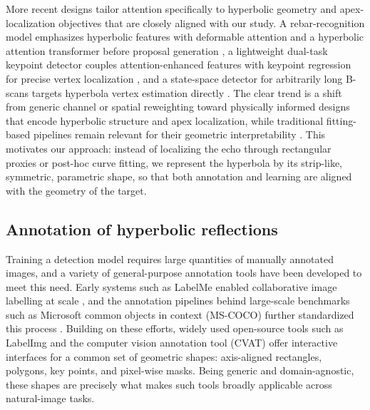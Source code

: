 \documentclass[lettersize,journal]{IEEEtran}
\begin{document}
More recent designs tailor attention specifically to hyperbolic geometry and apex-localization objectives that are closely aligned with our study. A rebar-recognition model emphasizes hyperbolic features with deformable attention and a hyperbolic attention transformer before proposal generation \cite{li2025rebar}, a lightweight dual-task keypoint detector couples attention-enhanced features with keypoint regression for precise vertex localization \cite{hou2025endtoend}, and a state-space detector for arbitrarily long B-scans targets hyperbola vertex estimation directly \cite{lan2024statespace}. The clear trend is a shift from generic channel or spatial reweighting toward physically informed designs that encode hyperbolic structure and apex localization, while traditional fitting-based pipelines remain relevant for their geometric interpretability \cite{lei2019autohyperbola}. This motivates our approach: instead of localizing the echo through rectangular proxies or post-hoc curve fitting, we represent the hyperbola by its strip-like, symmetric, parametric shape, so that both annotation and learning are aligned with the geometry of the target.


\subsection{Annotation of hyperbolic reflections}
Training a detection model requires large quantities of manually annotated images,
and a variety of general-purpose annotation tools have been developed to meet this need.
Early systems such as LabelMe enabled collaborative image labelling at scale \cite{russell2008labelme},
and the annotation pipelines behind large-scale benchmarks such as Microsoft common objects in context (MS-COCO)
further standardized this process \cite{lin2014coco}.
Building on these efforts, widely used open-source tools such as LabelImg \cite{tzutalin2015labelimg}
and the computer vision annotation tool (CVAT) \cite{cvat} offer interactive interfaces for a common set of
geometric shapes: axis-aligned rectangles, polygons, key points, and pixel-wise masks.
Being generic and domain-agnostic, these shapes are precisely 
what makes such tools broadly applicable across natural-image tasks.
\end{document}
